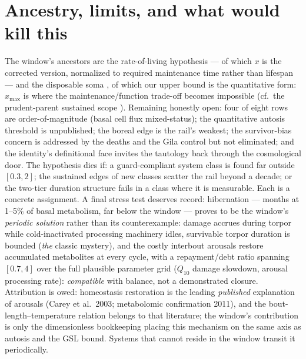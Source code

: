 \documentclass[11pt]{article}
\begin{document}
\section{Ancestry, limits, and what would kill this}
The window's ancestors are the rate-of-living hypothesis \cite{Pearl1928,Speakman2005} --- of
which $x$ is the corrected version, normalized to required maintenance time rather than lifespan
--- and the disposable soma \cite{Kirkwood1977}, of which our upper bound is the quantitative
form: $x_{\max}$ is where the maintenance/function trade-off becomes impossible
(cf.\ the prudent-parent sustained scope \cite{DrentDaan}). Remaining honestly open: four of
eight rows are order-of-magnitude (basal cell flux mixed-status); the quantitative autosis
threshold is unpublished; the boreal edge is the rail's weakest; the survivor-bias concern is
addressed by the deaths and the Gila control but not eliminated; and the identity's definitional
face invites the tautology back through the cosmological door. The hypothesis dies if: a
guard-compliant system class is found far outside $[0.3, 2]$; the sustained edges of new classes
scatter the rail beyond a decade; or the two-tier duration structure fails in a class where it
is measurable. Each is a concrete assignment. A final stress test deserves record: hibernation --- months at 1--5\% of basal metabolism, far below the window --- proves to be the window's \emph{periodic solution} rather than its counterexample: damage accrues during torpor while cold-inactivated processing machinery idles, survivable torpor duration is bounded (\emph{the} classic mystery), and the costly interbout arousals restore accumulated metabolites at every cycle, with a repayment/debt ratio spanning $[0.7, 4]$ over the full plausible parameter grid ($Q_{10}$ damage slowdown, arousal processing rate): \emph{compatible} with balance, not a demonstrated closure. Attribution is owed: homeostasis restoration is the leading \emph{published} explanation of arousals (Carey et al.\ 2003; metabolomic confirmation 2011), and the bout-length--temperature relation belongs to that literature; the window's contribution is only the dimensionless bookkeeping placing this mechanism on the same axis as autosis and the GSL bound. Systems that cannot reside in the window transit it periodically.
\end{document}
